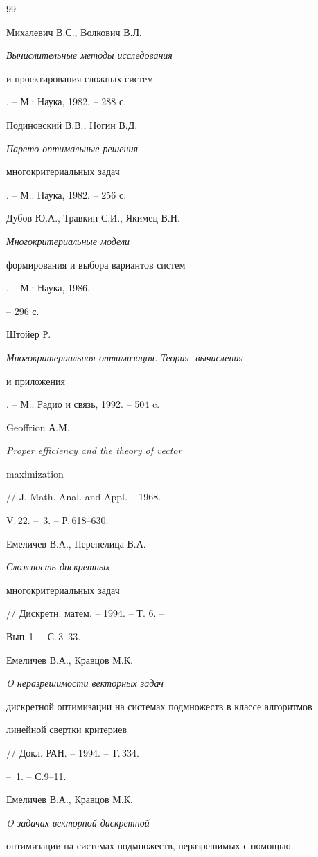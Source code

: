 \begin{thebibliography}{99} 


 




Михалевич В.С., Волкович В.Л. {\em Вычислительные методы исследования 


и проектирования сложных систем}. -- М.: Наука, 1982. -- 288 с. 




Подиновский В.В., Ногин В.Д. {\em Парето-оптимальные решения 


многокритериальных задач}. -- М.: Наука, 1982. -- 256 с. 




Дубов Ю.А., Травкин С.И., Якимец В.Н. {\em Многокритериальные модели 


формирования и выбора вариантов систем}. -- М.: Наука, 1986. 


-- 296 с. 




Штойер Р. {\em Многокритериальная оптимизация. Теория, вычисления 


и приложения}. -- М.: Радио и связь, 1992. -- 504 c. 




Geoffrion А.М. {\em Proper efficiency and the theory of vector 


maximization} // J. Math. Anal. and Appl. -- 1968. -- 


V.\,22. -- \No\,3. -- Р.\,618--630. 




Емеличев В.А., Перепелица В.А. {\em Сложность дискретных 


многокритериальных задач} // Дискретн. матем. -- 1994. -- Т. 6. -- 


Вып.\,1. -- С.\,3--33. 




Емеличев В.А., Кравцов М.К. {\em O неразрешимости векторных задач 


дискретной оптимизации на системах подмножеств в классе алгоритмов 


линейной свертки критериев} // Докл. РАН. -- 1994. -- Т.\,334. 


-- \No\,1. -- С.9--11. 




Емеличев В.А., Кравцов М.К. {\em O задачах векторной дискретной 


оптимизации на системах подмножеств, неразрешимых с помощью 


}
\end{thebibliography}
